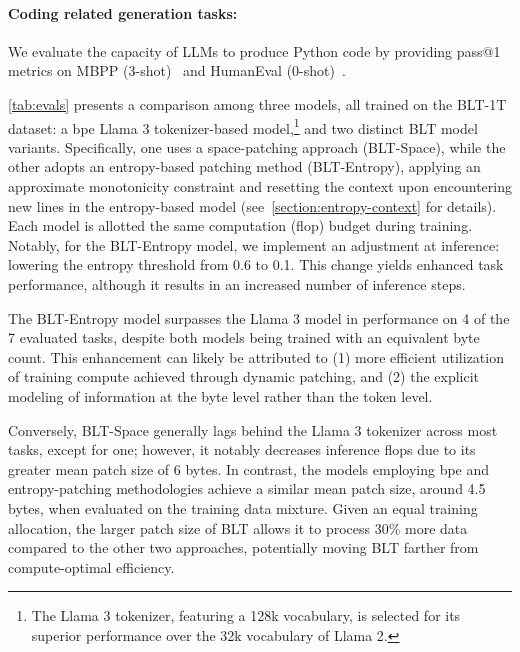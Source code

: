 \paragraph{Coding related generation tasks:}  We evaluate the capacity of LLMs to produce Python code by providing pass@1 metrics on MBPP (3-shot)~\citep{Eval_MBPP} and HumanEval (0-shot)~\citep{Eval_HumanEval}.

\autoref{tab:evals} presents a comparison among three models, all trained on the {\textsc BLT}-1T dataset: a bpe Llama 3 tokenizer-based model,\footnote{The Llama 3 tokenizer, featuring a 128k vocabulary, is selected for its superior performance over the 32k vocabulary of Llama 2.} and two distinct {\textsc BLT} model variants. Specifically, one uses a space-patching approach ({\textsc BLT}-Space), while the other adopts an entropy-based patching method ({\textsc BLT}-Entropy), applying an approximate monotonicity constraint and resetting the context upon encountering new lines in the entropy-based model (see~\autoref{section:entropy-context} for details). Each model is allotted the same computation (flop) budget during training. Notably, for the {\textsc BLT}-Entropy model, we implement an adjustment at inference: lowering the entropy threshold from 0.6 to 0.1. This change yields enhanced task performance, although it results in an increased number of inference steps.

The {\textsc BLT}-Entropy model surpasses the Llama 3 model in performance on 4 of the 7 evaluated tasks, despite both models being trained with an equivalent byte count. This enhancement can likely be attributed to (1) more efficient utilization of training compute achieved through dynamic patching, and (2) the explicit modeling of information at the byte level rather than the token level.

Conversely, {\textsc BLT}-Space generally lags behind the Llama 3 tokenizer across most tasks, except for one; however, it notably decreases inference flops due to its greater mean patch size of 6 bytes. In contrast, the models employing bpe and entropy-patching methodologies achieve a similar mean patch size, around 4.5 bytes, when evaluated on the training data mixture. Given an equal training allocation, the larger patch size of {\textsc BLT} allows it to process 30\% more data compared to the other two approaches, potentially moving {\textsc BLT} farther from compute-optimal efficiency.

